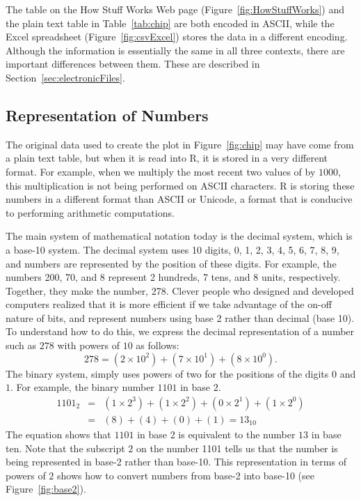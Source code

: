 The table on the How Stuff Works Web page
(Figure~\ref{fig:HowStuffWorks}) and the plain text table in
Table~\ref{tab:chip} are both encoded in ASCII, while the Excel
spreadsheet (Figure~\ref{fig:csvExcel}) stores the data in a
different encoding.  Although the information is essentially the same
in all three contexts, there are important differences between them.
These are described in Section~\ref{sec:electronicFiles}.


\subsection{Representation of Numbers}\label{sec:repNum}
The original data used to create the plot in Figure~\ref{fig:chip} may
have come from a plain text table, but when it is read into R, it is
stored in a very different format.  For example, when we multiply the
most recent two values of  by $1000$, this
multiplication is not being performed on ASCII characters.  R is
storing these numbers in a different format than ASCII or Unicode, a
format that is conducive to performing arithmetic computations.

The main system of mathematical notation today is the decimal system,
which is a base-10 system.  The decimal system uses 10 digits, 0, 1,
2, 3, 4, 5, 6, 7, 8, 9, and numbers are represented by the position of
these digits. For example, the numbers 200, 70, and 8 represent 2
hundreds, 7 tens, and 8 units, respectively. Together, they make the
number, 278.  Clever people who designed and developed computers
realized that it is more efficient if we take advantage of the on-off
nature of bits, and represent numbers using base 2 rather than decimal
(base 10).  To understand how to do this, we express the decimal
representation of a number such as $278$ with powers of $10$ as
follows:
\begin{equation}
278 = (2 \times 10^2) + (7 \times 10^1) + (8 \times 10^0).
\end{equation}
The binary system, simply uses powers of two for the positions of the
digits $0$ and $1$. For example, the binary number $1101$ in base $2$.
\begin{eqnarray*}
1101_{2} & = & (1 \times 2^3) + (1 \times 2^2) + (0 \times 2^1) + (1 \times 2^0) \\
     & = & (8) + (4) + (0 ) + (1 )  = 13_{10}
\end{eqnarray*}
The equation shows that $1101$ in base 2 is equivalent to the number
$13$ in base ten.  Note that the subscript $2$ on the number 1101
tells us that the number is being represented in base-2 rather than
base-10. This representation in terms of powers of $2$ shows how to
convert numbers from base-2 into base-10 (see Figure~\ref{fig:base2}).

